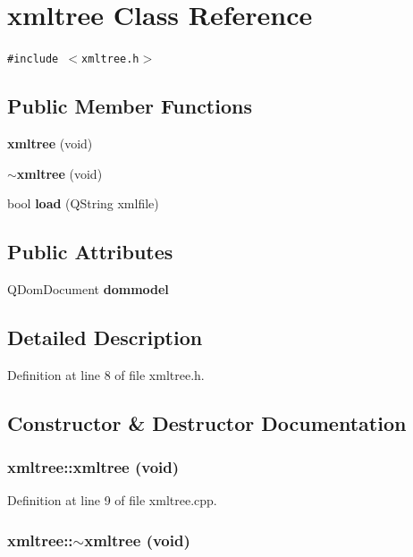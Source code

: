 \section{xmltree Class Reference}
\label{classxmltree}
{\tt \#include $<$xmltree.h$>$}

\subsection*{Public Member Functions}
\begin{CompactItemize}
\item 
{\bf xmltree} (void)
\item 
{\bf $\sim$xmltree} (void)
\item 
bool {\bf load} (QString xmlfile)
\end{CompactItemize}
\subsection*{Public Attributes}
\begin{CompactItemize}
\item 
QDom\-Document {\bf dommodel}
\end{CompactItemize}


\subsection{Detailed Description}




Definition at line 8 of file xmltree.h.

\subsection{Constructor \& Destructor Documentation}
\subsubsection{\setlength{\rightskip}{0pt plus 5cm}xmltree::xmltree (void)}\label{classxmltree_17a7ee598a19c132e65454eb12c81c43}




Definition at line 9 of file xmltree.cpp.
\subsubsection{\setlength{\rightskip}{0pt plus 5cm}xmltree::$\sim$xmltree (void)}\label{classxmltree_8194144c9bea144ab12c218d97bc1350}




